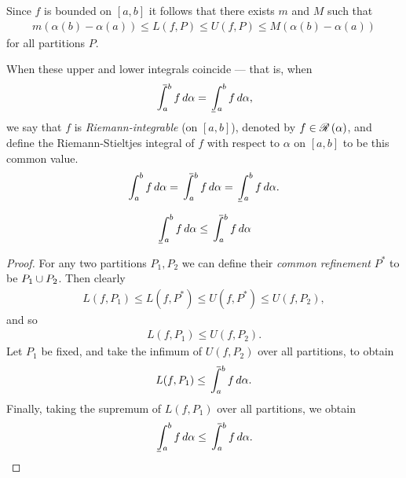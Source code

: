 \begin{rmk}
    Since $f$ is bounded on $[a, b]$ it follows that there exists $m$ and $M$ such that
    \begin{align*}
        m(\alpha(b) - \alpha(a)) \leq L(f, P) \leq U(f, P) \leq M(\alpha(b) - \alpha(a))
    \end{align*}
    for all partitions $P$.
\end{rmk}

\begin{defn}
    When these upper and lower integrals coincide --- that is, when
    \begin{align*}
        \upperint_{a}^{b}f\,d\alpha = \lowerint_{a}^{b}f\,d\alpha,
    \end{align*}
    we say that $f$ is \emph{Riemann-integrable} (on $[a, b]$), denoted by $f \in \mathscr{R}\left({\alpha}\right)$, and define the Riemann-Stieltjes integral of $f$ with respect to $\alpha$ on $[a, b]$ to be this common value. 
    \begin{align*}
        \int_{a}^{b}f\,d\alpha = \upperint_{a}^{b}f\,d\alpha = \lowerint_{a}^{b}f\,d\alpha.
    \end{align*}
\end{defn}

\begin{thm}
    \begin{align*}
        \lowerint_{a}^{b}f\,d\alpha \leq \upperint_{a}^{b}f\,d\alpha
    \end{align*}
\end{thm}

\begin{proof}
    For any two partitions $P_1, P_2$ we can define their \emph{common refinement} $P^{*}$ to be $P_1 \cup P_2$. Then clearly
    \begin{align*}
        L(f, P_1) \leq L(f, P^{*}) \leq U(f, P^{*}) \leq U(f, P_2),
    \end{align*}
    and so
    \begin{align*}
        L(f, P_1) \leq U(f, P_2).
    \end{align*}
    Let $P_1$ be fixed, and take the infimum of $U(f, P_2)$ over all partitions, to obtain
    \begin{align*}
        L(f, P_1) \leq \upperint_{a}^{b}f\,d\alpha.
    \end{align*}
    Finally, taking the supremum of $L(f, P_1)$ over all partitions, we obtain
    \begin{align*}
        \lowerint_{a}^{b}f\,d\alpha \leq \upperint_{a}^{b}f\,d\alpha.   
    \end{align*}
\end{proof}

